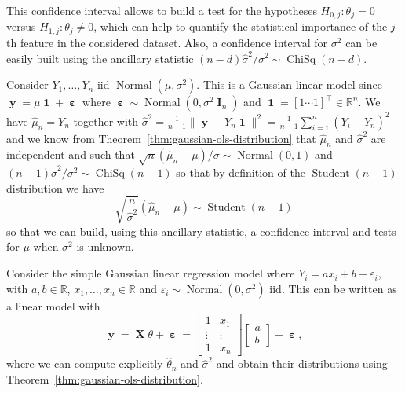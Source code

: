 \documentclass[
	fontsize=11pt, %
	twoside=false, %
	numbers=noenddot, %
]{kaobook}
\DeclareMathOperator{\bI}{{\boldsymbol I}}
\DeclareMathOperator{\bX}{{\boldsymbol X}}
\DeclareMathOperator{\by}{{\boldsymbol y}}
\DeclareMathOperator{\bone}{\boldsymbol 1}
\DeclareMathOperator{\beps}{\boldsymbol \varepsilon}
\DeclareMathOperator{\chisq}{ChiSq}
\DeclareMathOperator{\nor}{Normal}
\DeclareMathOperator{\stu}{Student}
\newcommand{\eps}{\varepsilon}
\newcommand{\R}{\mathbb R}
\newcommand{\wh}{\widehat}
\newcommand{\norm}[1]{\| #1 \|}
\begin{document}
This confidence interval allows to build a test for the hypotheses $H_{0, j} : \theta_j = 0$ versus $H_{1, j} : \theta_j \neq 0$, which can help to quantify the statistical importance of the $j$-th feature in the considered dataset.
Also, a confidence interval for $\sigma^2$ can be easily built using the ancillary statistic $(n - d) \wh \sigma^2 / \sigma^2 \sim \chisq(n - d)$.

\begin{example}
	Consider $Y_1, \ldots, Y_n$ iid $\nor(\mu, \sigma^2)$. This is a Gaussian linear model since $\by = \mu \bone + \beps$ where $\beps \sim \nor(0, \sigma^2 \bI_n)$ and $\bone = [1 \cdots 1]^\top \in \R^n$.
	We have%
	\marginnote{using $(\bone^\top \bone)^{-1} \bone^\top \by = n^{-1} \sum_{i=1}^n Y_i$}
	$\wh \mu_n = \bar Y_n$ together with $\wh \sigma^2 = \frac{1}{n-1} \norm{\by - \bar Y_n \bone}^2 = \frac{1}{n-1} \sum_{i=1}^n (Y_i - \bar Y_n)^2$ and we know from Theorem~\ref{thm:gaussian-ols-distribution} that $\wh \mu_n$ and $\wh \sigma^2$ are independent and such that $\sqrt n (\wh \mu_n - \mu) / \sigma \sim \nor(0, 1)$ and $(n-1) \wh \sigma^2/\sigma^2 \sim \chisq(n-1)$ so that by definition of the $\stu(n-1)$ distribution we have
	\begin{equation*}
		\sqrt{\frac{n}{\wh \sigma^2}} (\wh \mu_n - \mu) \sim \stu(n-1)
	\end{equation*}
	so that we can build, using this ancillary statistic, a confidence interval and tests for $\mu$ when $\sigma^2$ is unknown.
\end{example}

\begin{example}
	Consider the simple Gaussian linear regression model where $Y_i = a x_i + b + \eps_i$, with $a, b \in \R$, $x_1, \ldots, x_n \in \R$ and $\eps_i \sim \nor(0, \sigma^2)$ iid. This can be written as a linear model with
	\begin{equation*}
		\by = \bX \theta + \beps =
		\begin{bmatrix}
			1 & x_1 \\
			\vdots & \vdots \\
			1 & x_n
		\end{bmatrix}
		\begin{bmatrix}
			a \\
			b
		\end{bmatrix}
		+ \beps,
	\end{equation*}
	where we can compute explicitly $\wh \theta_n$ and $\wh \sigma^2$ and obtain their distributions using Theorem~\ref{thm:gaussian-ols-distribution}.
\end{example}
\end{document}
